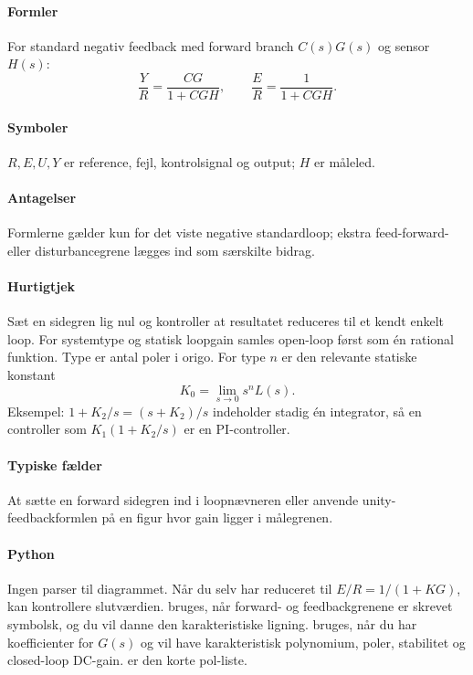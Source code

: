 \paragraph{Formler}
For standard negativ feedback med forward branch \(C(s)G(s)\) og sensor \(H(s)\):
\begin{equation}
\label{eq:standard-feedback}
\frac{Y}{R}=\frac{CG}{1+CGH},\qquad
\frac{E}{R}=\frac{1}{1+CGH}.
\end{equation}

\paragraph{Symboler}
\(R,E,U,Y\) er reference, fejl, kontrolsignal og output; \(H\) er måleled.

\paragraph{Antagelser}
Formlerne gælder kun for det viste negative standardloop; ekstra feed-forward- eller
disturbancegrene lægges ind som særskilte bidrag.

\paragraph{Hurtigtjek}
Sæt en sidegren lig nul og kontroller at resultatet reduceres til et kendt enkelt loop.
For systemtype og statisk loopgain samles open-loop først som én rational funktion.
Type er antal poler i origo. For type \(n\) er den relevante statiske konstant
\[
K_0=\lim_{s\to0}s^nL(s).
\]
Eksempel: \(1+K_2/s=(s+K_2)/s\) indeholder stadig én integrator, så en controller som
\(K_1(1+K_2/s)\) er en PI-controller.

\paragraph{Typiske fælder}
At sætte en forward sidegren ind i loopnævneren eller anvende unity-feedbackformlen på
en figur hvor gain ligger i målegrenen.

\paragraph{Python}
Ingen parser til diagrammet. Når du selv har reduceret til \(E/R=1/(1+KG)\), kan
 kontrollere slutværdien.
 bruges, når forward- og
feedbackgrenene er skrevet symbolsk, og du vil danne den karakteristiske ligning.
 bruges, når du har
koefficienter for \(G(s)\) og vil have karakteristisk polynomium, poler, stabilitet og
closed-loop DC-gain.  er den korte pol-liste.

